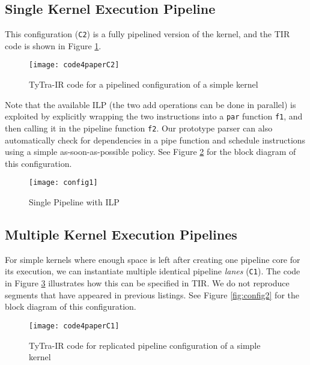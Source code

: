 \documentclass[]{heart2015_WN4Pre}
\begin{document}
\subsection{Single Kernel Execution Pipeline}
\label{sec:illustration-config2}

This configuration (\texttt{C2}) is a fully pipelined version of the kernel, and the TIR code is shown in Figure \ref{fig:code4paperC2}. 

\begin{figure}[th]
\centering
\texttt{[image: code4paperC2]}
\caption{TyTra-IR code for a pipelined configuration of a simple kernel}
\label{fig:code4paperC2}
\end{figure}

Note that the available ILP (the two add operations can be done in parallel) is exploited by explicitly wrapping the two instructions into a \texttt{par} function \texttt{f1}, and then calling it in the pipeline function \texttt{f2}. Our prototype parser can also automatically check for dependencies in a pipe function and schedule instructions using a simple as-soon-as-possible policy. See Figure \ref{fig:config1} for the block diagram of this configuration.

\begin{figure}[th]
\centering
\texttt{[image: config1]}
\caption[]{Single Pipeline with ILP}
\label{fig:config1}
\end{figure}


\subsection{Multiple Kernel Execution Pipelines}
\label{sec:illustration-config3}

For simple kernels where enough space is left after creating one pipeline core for its execution, we can instantiate multiple identical pipeline \textit{lanes} (\texttt{C1}). The code in Figure \ref{fig:code4paperC1} illustrates how this can be specified in TIR. We do not reproduce segments that have appeared in previous listings. See Figure \ref{fig:config2} for the block diagram of this configuration.

\begin{figure}[th]
\centering
\texttt{[image: code4paperC1]}
\caption{TyTra-IR code for replicated pipeline configuration of a simple kernel}
\label{fig:code4paperC1}
\end{figure}
\end{document}
